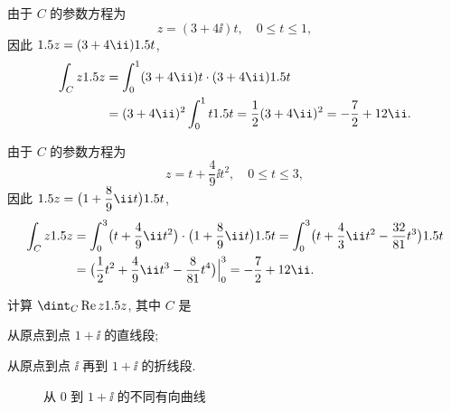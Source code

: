 \begin{solutionenum}
  \item 由于 $C$ 的参数方程为
  \[
    z=(3+4\ii)t,\quad 0\le t\le 1,
  \]
  因此 $\d z=(3+4\ii)\d t$,
  \begin{align*}
      \int_C z\d z&
    =\int_0^1(3+4\ii)t\cdot(3+4\ii)\d t\\&
    =(3+4\ii)^2\int_0^1t\d t
    =\half (3+4\ii)^2=-\frac72+12\ii.
  \end{align*}
  \item 由于 $C$ 的参数方程为
  \[
    z=t+\dfrac49\ii t^2,\quad 0\le t\le 3,
  \]
  因此 $\d z=\bigl(1+\dfrac89 \ii t\bigr)\d t$,
  \begin{align*}
      \int_C z\d z&
    =\int_0^3\bigl(t+\frac{4}9\ii t^2\bigr)\cdot\bigl(1+\frac89\ii t\bigr)\d t
    =\int_0^3\bigl(t+\frac43\ii t^2-\frac{32}{81}t^3\bigr)\d t\\&
    =\bigl(\half t^2+\frac49\ii t^3-\frac8{81}t^4\bigr)\Big|_0^3
    =-\frac72+12\ii.
  \end{align*}
\end{solutionenum}

\begin{example}
  \label{exam:re-z-integral}
  计算 $\dint_C\Re z\d z$, 其中 $C$ 是
  \begin{subexample}
    \item 从原点到点 $1+\ii$ 的直线段;
    \item 从原点到点 $\ii$ 再到 $1+\ii$ 的折线段.
  \end{subexample}
\end{example}

\begin{figure}[!htb]
  \centering
  \caption{从 $0$ 到 $1+\ii$ 的不同有向曲线}
\end{figure}

